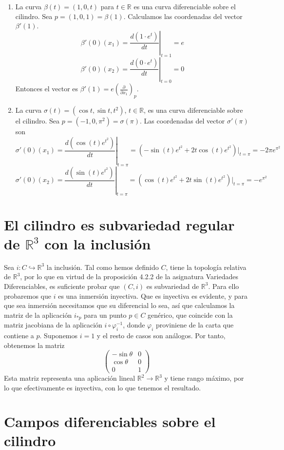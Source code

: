 \documentclass[twoside, 11pt]{article}
\theoremstyle{definition}
\newcommand{\R}{\mathbb{R}}
\newcommand{\parcial}[2]{\frac{\partial #1}{\partial #2}}
\begin{document}
\begin{enumerate}
\item  La curva $\beta(t)=(1, 0, t)$ para $t\in\R$ es una curva diferenciable sobre el cilindro. Sea $p=(1,0,1)=\beta(1)$. Calculamos las coordenadas del vector $\beta'(1)$.
\[
\beta'(0)(x_1)=\left.\frac{d(1\cdot e^t)}{dt}\right|_{t=1}=e
\]
\[
\beta'(0)(x_2)=\left.\frac{d(0\cdot e^t)}{dt}\right|_{t=0}=0
\]
Entonces el vector es $\beta'(1)=e\left(\parcial{}{x_1}\right)_p$. 

\item La curva $\sigma(t)=(\cos t, \sin t, t^2)$, $t\in\R$, es una curva diferenciable sobre el cilindro. Sea $p=(-1,0,\pi^2)=\sigma(\pi)$. Las coordenadas del vector $\sigma'(\pi)$ son
\[
\sigma'(0)(x_1)=\left.\frac{d(\cos(t) e^{t^2})}{dt}\right|_{t=\pi}=(-\sin(t)e^{t^2}+2t\cos(t)e^{t^2})|_{t=\pi}=-2\pi e^{\pi^2}
\]
\[
\sigma'(0)(x_2)=\left.\frac{d(\sin(t) e^{t^2})}{dt}\right|_{t=\pi}=(\cos(t)e^{t^2}+2t\sin(t)e^{t^2})|_{t=\pi}=-e^{\pi^2}
\]

\end{enumerate}


\section{El cilindro es subvariedad regular de $\R^3$ con la inclusión}


Sea $i:C\hookrightarrow \R^3$ la inclusión. Tal como hemos definido $C$, tiene la topología relativa de $\R^3$, por lo que en virtud de la proposición 4.2.2 de la asignatura Variedades Diferenciables, es suficiente probar que $(C,i)$ es subvariedad de $\R^3$. Para ello probaremos que $i$ es una inmersión inyectiva. Que es inyectiva es evidente, y para que sea inmersión necesitamos que su diferencial lo sea, así que calculamos la matriz de la aplicación $i_{*p}$ para un punto $p\in C$ genérico, que coincide con la matriz jacobiana de la aplicación $i\circ \varphi^{-1}_i$, donde $\varphi_i$ proviniene de la carta que contiene a $p$. Suponemos $i=1$ y el resto de casos son análogos. Por tanto, obtenemos la matriz
\[
\begin{pmatrix}
-\sin\theta & 0 \\
\cos\theta & 0\\
0 & 1
\end{pmatrix}
\]
Esta matriz representa una aplicación lineal $\R^2\to\R^3$ y tiene rango máximo, por lo que efectivamente es inyectiva, con lo que tenemos el resultado. 

\section{Campos diferenciables sobre el cilindro}
\end{document}
